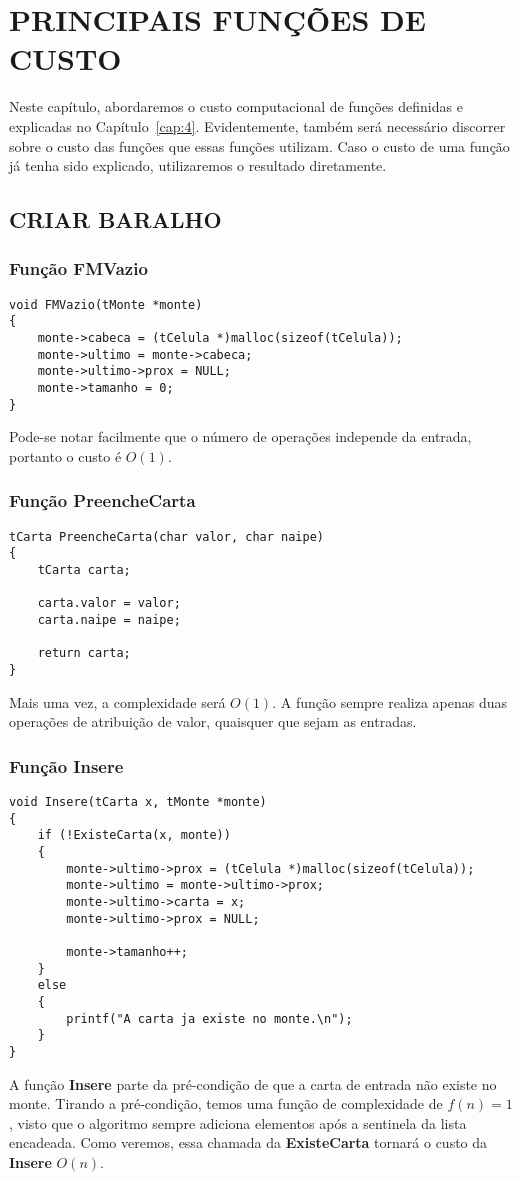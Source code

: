 \documentclass[12pt, oneside, a4paper, brazil]{abntex2}
\begin{document}
\chapter{PRINCIPAIS FUNÇÕES DE CUSTO}\label{cap:7}
Neste capítulo, abordaremos o custo computacional de funções definidas e explicadas no Capítulo~\ref{cap:4}. Evidentemente, também será necessário discorrer sobre o custo das funções que essas funções utilizam. Caso o custo de uma função já tenha sido explicado, utilizaremos o resultado diretamente.

\section{CRIAR BARALHO}
\subsection{Função FMVazio}
\begin{lstlisting}
void FMVazio(tMonte *monte)
{
    monte->cabeca = (tCelula *)malloc(sizeof(tCelula));
    monte->ultimo = monte->cabeca;
    monte->ultimo->prox = NULL;
    monte->tamanho = 0;
}
\end{lstlisting}
Pode-se notar facilmente que o número de operações independe da entrada, portanto o custo é $O(1)$.

\subsection{Função PreencheCarta}
\begin{lstlisting}
tCarta PreencheCarta(char valor, char naipe)
{
    tCarta carta;

    carta.valor = valor;
    carta.naipe = naipe;

    return carta;
}
\end{lstlisting}
Mais uma vez, a complexidade será $O(1)$. A função sempre realiza apenas duas operações de atribuição de valor, quaisquer que sejam as entradas.

\subsection{Função Insere}\label{subse:custoInsere}
\begin{lstlisting}
void Insere(tCarta x, tMonte *monte)
{
    if (!ExisteCarta(x, monte))
    {
        monte->ultimo->prox = (tCelula *)malloc(sizeof(tCelula));
        monte->ultimo = monte->ultimo->prox;
        monte->ultimo->carta = x;
        monte->ultimo->prox = NULL;

        monte->tamanho++;
    }
    else
    {
        printf("A carta ja existe no monte.\n");
    }
}
\end{lstlisting}
A função \textbf{Insere} parte da pré-condição de que a carta de entrada não existe no monte. Tirando a pré-condição, temos uma função de complexidade de $f(n) = 1$, visto que o algoritmo sempre adiciona elementos após a sentinela da lista encadeada. Como veremos, essa chamada da \textbf{ExisteCarta} tornará o custo da \textbf{Insere} $O(n)$.
\end{document}
